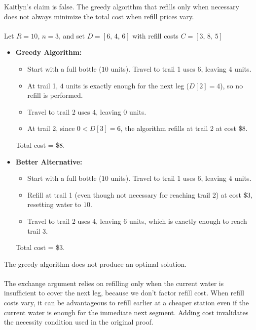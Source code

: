 \documentclass[11pt,addpoints,answers]{exam}
\begin{document}
\begin{questions}
\begin{parts}
    \begin{solution}
      Kaitlyn's claim is false. The greedy algorithm that refills only when necessary does not always minimize the total cost when refill prices vary.\\
      \\
      Let $R = 10$, $n = 3$, and set $D = [6,\, 4,\, 6]$ with refill costs $C = [3,\, 8,\, 5]$
      \begin{itemize}
          \item \textbf{Greedy Algorithm:}
          \begin{itemize}
              \item Start with a full bottle ($10$ units). Travel to trail 1 uses $6$, leaving $4$ units.
              \item At trail 1, $4$ units is exactly enough for the next leg ($D[2]=4$), so no refill is performed.
              \item Travel to trail 2 uses $4$, leaving $0$ units.
              \item At trail 2, since $0 < D[3]=6$, the algorithm refills at trail 2 at cost \$8.
          \end{itemize}
          Total cost = \$8.
          
          \item \textbf{Better Alternative:}
          \begin{itemize}
              \item Start with a full bottle ($10$ units). Travel to trail 1 uses $6$, leaving $4$ units.
              \item Refill at trail 1 (even though not necessary for reaching trail 2) at cost \$3, resetting water to $10$.
              \item Travel to trail 2 uses $4$, leaving $6$ units, which is exactly enough to reach trail 3.
          \end{itemize}
          Total cost = \$3.
      \end{itemize}
      
      The greedy algorithm does not produce an optimal solution.\\
      \\
      The exchange argument relies on refilling only when the current water is insufficient to cover the next leg, because we don't factor refill cost. When refill costs vary, it can be advantageous to refill earlier at a cheaper station even if the current water is enough for the immediate next segment. Adding cost invalidates the necessity condition used in the original proof.
    \end{solution}
      

\end{parts}
\end{questions}
\end{document}
